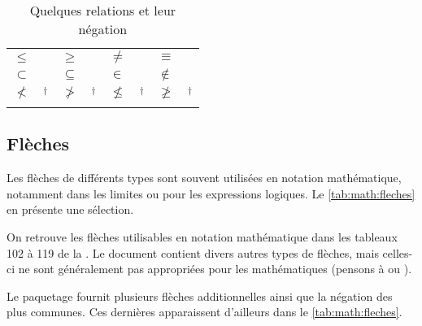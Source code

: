 \begin{table}
  \caption{Quelques relations et leur négation}
  \label{tab:math:relations}
  \begin{tabularx}{1.0\linewidth}{lXlXlXlX}
    $\leq$      & \cmd{\leq} &
    $\geq$      & \cmd{\geq}   &
    $\neq$      & \cmd{\neq}    &
    $\equiv$    & \cmd{\equiv}    \\
    $\subset$   & \cmd{\subset} &
    $\subseteq$ & \cmd{\subseteq}  &
    $\in$       & \cmd{\in} &
    $\notin$    & \cmd{\notin} \\
    $\nless$    & \cmd{\nless}$^\dagger$ &
    $\ngtr$     & \cmd{\ngtr}$^\dagger$   &
    $\nleq$     & \cmd{\nleq}$^\dagger$    &
    $\ngeq$     & \cmd{\ngeq}$^\dagger$ \\
    \addlinespace
  \end{tabularx}
\end{table}

\subsection{Flèches}
\label{sec:math:symboles:fleches}

Les flèches de différents types sont souvent utilisées en notation
mathématique, notamment dans les limites ou pour les expressions
logiques. Le \autoref{tab:math:fleches} en présente une sélection.

On retrouve les flèches utilisables en notation mathématique dans les
tableaux 102 à 119 de la %
. %
Le document contient divers autres types de flèches, mais celles-ci ne
sont généralement pas appropriées pour les mathématiques (pensons à
{\manerrarrow} ou {\faArrowRight}).

Le paquetage  fournit plusieurs flèches additionnelles
ainsi que la négation des plus communes. Ces dernières apparaissent
d'ailleurs dans le \autoref{tab:math:fleches}.

